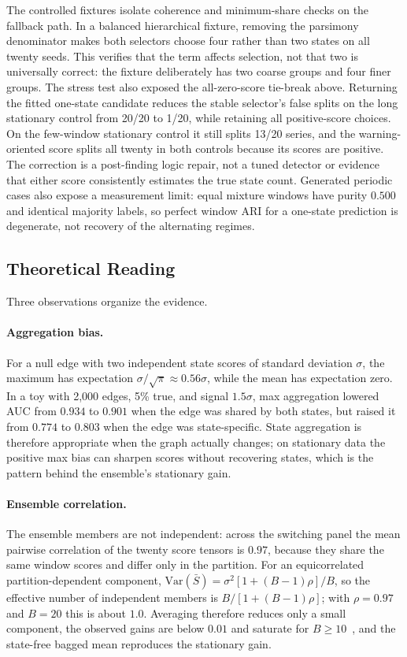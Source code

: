 \documentclass[sigconf,anonymous]{acmart}
\begin{document}
The controlled fixtures isolate coherence and minimum-share checks on the fallback path.
In a balanced hierarchical fixture, removing the parsimony denominator makes both selectors choose four rather than two states on all twenty seeds.
This verifies that the term affects selection, not that two is universally correct: the fixture deliberately has two coarse groups and four finer groups.
The stress test also exposed the all-zero-score tie-break above. Returning the fitted one-state candidate reduces the stable selector's false splits on the long stationary control from 20/20 to 1/20, while retaining all positive-score choices.
On the few-window stationary control it still splits 13/20 series, and the warning-oriented score splits all twenty in both controls because its scores are positive.
The correction is a post-finding logic repair, not a tuned detector or evidence that either score consistently estimates the true state count.
Generated periodic cases also expose a measurement limit: equal mixture windows have purity $0.500$ and identical majority labels, so perfect window ARI for a one-state prediction is degenerate, not recovery of the alternating regimes.

\subsection{Theoretical Reading}
\label{sec:theory}

Three observations organize the evidence.

\paragraph{Aggregation bias.}
For a null edge with two independent state scores of standard deviation $\sigma$, the maximum has expectation $\sigma/\sqrt{\pi}\approx0.56\sigma$, while the mean has expectation zero.
In a toy with 2,000 edges, 5\% true, and signal $1.5\sigma$, max aggregation lowered AUC from $0.934$ to $0.901$ when the edge was shared by both states, but raised it from $0.774$ to $0.803$ when the edge was state-specific.
State aggregation is therefore appropriate when the graph actually changes; on stationary data the positive max bias can sharpen scores without recovering states, which is the pattern behind the ensemble's stationary gain.

\paragraph{Ensemble correlation.}
The ensemble members are not independent: across the switching panel the mean pairwise correlation of the twenty score tensors is $0.97$, because they share the same window scores and differ only in the partition.
For an equicorrelated partition-dependent component, $\mathrm{Var}(\bar S)=\sigma^2[1+(B-1)\rho]/B$, so the effective number of independent members is $B/[1+(B-1)\rho]$; with $\rho=0.97$ and $B=20$ this is about $1.0$.
Averaging therefore reduces only a small component, the observed gains are below $0.01$ and saturate for $B\ge10$~\cite{breiman1996bagged}, and the state-free bagged mean reproduces the stationary gain.
\end{document}
